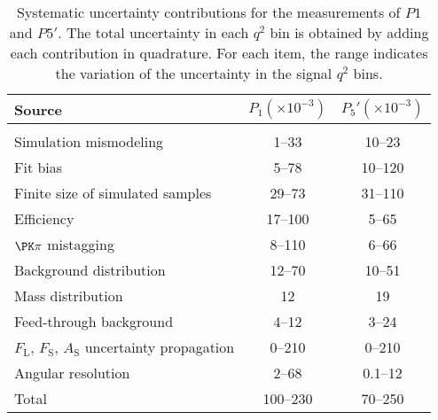 \begin{table*}[htbp]
  \centering
  \caption{\label{tab:systematics} Systematic uncertainty contributions for the measurements of $P1$ and $P5'$.
    The total uncertainty in each $q^2$ bin is obtained by adding each contribution in quadrature.
    For each item, the range indicates the variation of the uncertainty in the signal $q^2$ bins.}
  \begin{tabular}{lcc}
    Source & $P_1 (\times 10^{-3})$ & $P_5' (\times 10^{-3})$ \\[1pt]
    \hline \\[-2ex]
    Simulation mismodeling       &   1--33   &  10--23  \\[1pt]
    Fit bias                     &   5--78   &  10--120 \\[1pt]
    Finite size of simulated samples  &  29--73   &  31--110 \\[1pt]
    Efficiency                   &  17--100  &   5--65  \\[1pt]
    $\PK\pi$ mistagging          &   8--110  &   6--66  \\[1pt]
    Background distribution      &  12--70   &  10--51  \\[1pt]
    Mass distribution            &      12   &      19  \\[1pt]
    Feed-through background      &   4--12   &   3--24  \\[1pt]
    $F_\mathrm{L}$, $F_\mathrm{S}$, $A_\mathrm{S}$ uncertainty propagation & 0--210 & 0--210 \\[1pt]
    Angular resolution           &   2--68   & 0.1--12  \\[1pt]
    \hline
    Total                        & 100--230  &  70--250 \\[1pt]
  \end{tabular}
\end{table*}
